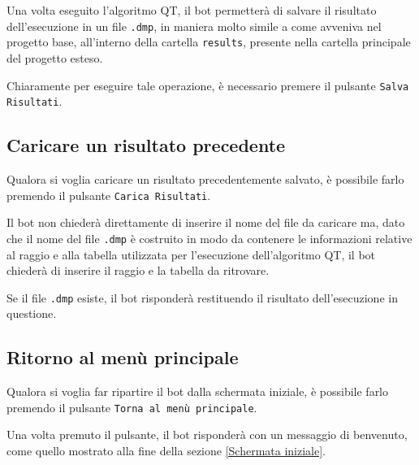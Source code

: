 Una volta eseguito l'algoritmo QT, il bot permetterà di salvare il risultato dell'esecuzione in un file \texttt{.dmp}, in maniera molto simile a come avveniva nel progetto base, all'interno della cartella \texttt{results}, presente nella cartella principale del progetto esteso. 


Chiaramente per eseguire tale operazione, è necessario premere il pulsante \texttt{Salva Risultati}. 


\subsection{Caricare un risultato precedente}

Qualora si voglia caricare un risultato precedentemente salvato, è possibile farlo premendo il pulsante \texttt{Carica Risultati}. 


Il bot non chiederà direttamente di inserire il nome del file da caricare ma, dato che il nome del file \texttt{.dmp} è costruito in modo da contenere le informazioni relative al raggio e alla tabella utilizzata per l'esecuzione dell'algoritmo QT, il bot chiederà di inserire il raggio e la tabella da ritrovare. 

Se il file \texttt{.dmp} esiste, il bot risponderà restituendo il risultato dell'esecuzione in questione. 


\subsection{Ritorno al menù principale}

Qualora si voglia far ripartire il bot dalla schermata iniziale, è possibile farlo premendo il pulsante \texttt{Torna al menù principale}.

Una volta premuto il pulsante, il bot risponderà con un messaggio di benvenuto, come quello mostrato alla fine della sezione \ref{Schermata iniziale}.

